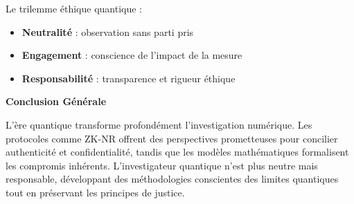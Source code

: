 \documentclass[12pt, a4paper]{article}
\begin{document}
		Le trilemme éthique quantique :
		\begin{itemize}
			\item \textbf{Neutralité} : observation sans parti pris
			\item \textbf{Engagement} : conscience de l'impact de la mesure
			\item \textbf{Responsabilité} : transparence et rigueur éthique
		\end{itemize}
		
		\vspace{0.5cm}
		\textbf{Conclusion Générale}
		
		L'ère quantique transforme profondément l'investigation numérique. Les protocoles comme ZK-NR offrent des perspectives prometteuses pour concilier authenticité et confidentialité, tandis que les modèles mathématiques formalisent les compromis inhérents. L'investigateur quantique n'est plus neutre mais responsable, développant des méthodologies conscientes des limites quantiques tout en préservant les principes de justice.
		
		
\end{document}
